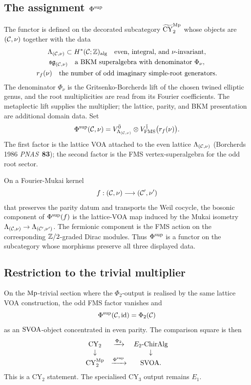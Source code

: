 \subsection*{The assignment \(\Phi^{\mathrm{sup}}\)}

The functor is defined on the decorated subcategory
\(\widetilde{\mathrm{CY}}_2^{\mathrm{Mp}}\) whose objects are \((\mathcal{C},\nu)\) together
with the data
\[
\begin{gathered}
  \Lambda_{(\mathcal{C},\nu)}\subset H^*(\mathcal{C};\mathbb{Z})_{\mathrm{alg}}
  \quad\text{even, integral, and \(\nu\)-invariant},\\
  \mathfrak{sg}_{(\mathcal{C},\nu)}
  \quad\text{a BKM superalgebra with denominator \(\Phi_\nu\)},\\
  r_f(\nu)
  \quad\text{the number of odd imaginary simple-root generators}.
\end{gathered}
\]
The denominator \(\Phi_\nu\) is the Gritsenko-Borcherds lift of the
chosen twined elliptic genus, and the root multiplicities are read from
its Fourier coefficients. The metaplectic lift supplies the multiplier;
the lattice, parity, and BKM presentation are additional domain data.
Set
\[
  \Phi^{\mathrm{sup}}(\mathcal{C},\nu)
  =
  V_{\Lambda_{(\mathcal{C},\nu)}}^{\bar 0}
  \otimes
  V_{\mathrm{FMS}}^{\bar 1}\bigl(r_f(\nu)\bigr).
\]
The first factor is the lattice VOA attached to the even lattice
\(\Lambda_{(\mathcal{C},\nu)}\) (Borcherds 1986 \emph{PNAS}~\textbf{83}); the
second factor is the FMS vertex-superalgebra for the odd root sector.

On a Fourier-Mukai kernel
\[
  f:(\mathcal{C},\nu)\longrightarrow(\mathcal{C}',\nu')
\]
that preserves the parity datum and transports the Weil cocycle, the
bosonic component of \(\Phi^{\mathrm{sup}}(f)\) is the lattice-VOA map induced by
the Mukai isometry
\(\Lambda_{(\mathcal{C},\nu)}\to\Lambda_{(\mathcal{C}',\nu')}\). The fermionic
component is the FMS action on the corresponding \(\mathbb{Z}/2\)-graded
Dirac modules. Thus \(\Phi^{\mathrm{sup}}\) is a functor on the subcategory whose
morphisms preserve all three displayed data.

\subsection*{Restriction to the trivial multiplier}

On the \(\mathrm{Mp}\)-trivial section where the \(\Phi_2\)-output is realised
by the same lattice VOA construction, the odd FMS factor vanishes and
\[
  \Phi^{\mathrm{sup}}(\mathcal{C},\mathrm{id})=\Phi_2(\mathcal{C})
\]
as an \(\mathrm{SVOA}\)-object concentrated in even parity.
The comparison square is then
\[
\begin{array}{ccc}
  \mathrm{CY}_2 & \xrightarrow{\Phi_2} & E_2\text{-}\mathrm{ChirAlg} \\
  \downarrow & & \downarrow \\
  \mathrm{CY}_2^{\mathrm{Mp}} & \xrightarrow{\Phi^{\mathrm{sup}}} & \mathrm{SVOA} .
\end{array}
\]
This is a CY\(_2\) statement. The specialised CY\(_3\) output remains
\(E_1\).

